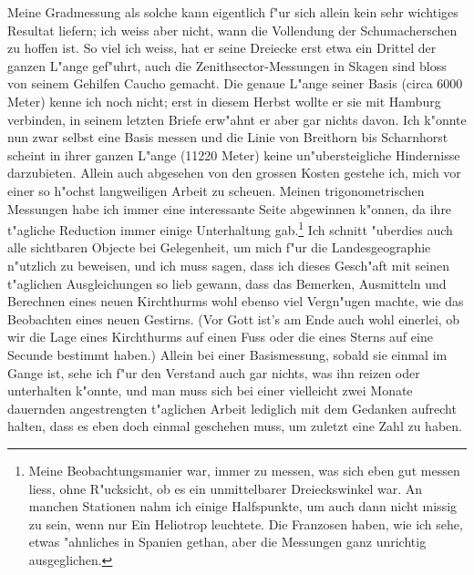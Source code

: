 \documentclass[12pt,a4paper]{article}
\theoremstyle{plain}
\theoremstyle{definition}
\theoremstyle{remark}
\begin{document}
\newpage
\noindent Meine Gradmessung als solche kann eigentlich f"ur sich allein kein sehr wichtiges Resultat liefern; ich weiss aber nicht, wann die Vollendung der Schumacherschen zu hoffen ist. So viel ich weiss, hat er seine Dreiecke erst etwa ein Drittel der ganzen L"ange gef"uhrt, auch die Zenithsector-Messungen in Skagen sind bloss von seinem Gehilfen Caucho gemacht. Die genaue L"ange seiner Basis (circa 6000 Meter) kenne ich noch nicht; erst in diesem Herbst wollte er sie mit Hamburg verbinden, in seinem letzten Briefe erw"ahnt er aber gar nichts davon. Ich k"onnte nun zwar selbst eine Basis messen und die Linie von Breithorn bis Scharnhorst scheint in ihrer ganzen L"ange (11220 Meter) keine un"ubersteigliche Hindernisse darzubieten. Allein auch abgesehen von den grossen Kosten gestehe ich, mich vor einer so h"ochst langweiligen Arbeit zu scheuen. Meinen trigonometrischen Messungen habe ich immer eine interessante Seite abgewinnen k"onnen, da ihre t"agliche Reduction immer einige Unterhaltung gab.\footnote{Meine Beobachtungsmanier war, immer zu messen, was sich eben gut messen liess, ohne R"ucksicht, ob es ein unmittelbarer Dreieckswinkel war. An manchen Stationen nahm ich einige Halfspunkte, um auch dann nicht missig zu sein, wenn nur Ein Heliotrop leuchtete. Die Franzosen haben, wie ich sehe, etwas "ahnliches in Spanien gethan, aber die Messungen ganz unrichtig ausgeglichen.} Ich schnitt "uberdies auch alle sichtbaren Objecte bei Gelegenheit, um mich f"ur die Landesgeographie n"utzlich zu beweisen, und ich muss sagen, dass ich dieses Gesch"aft mit seinen t"aglichen Ausgleichungen so lieb gewann, dass das Bemerken, Ausmitteln und Berechnen eines neuen Kirchthurms wohl ebenso viel Vergn"ugen machte, wie das Beobachten eines neuen Gestirns. (Vor Gott ist's am Ende auch wohl einerlei, ob wir die Lage eines Kirchthurms auf einen Fuss oder die eines Sterns auf eine Secunde bestimmt haben.) Allein bei einer Basismessung, sobald sie einmal im Gange ist, sehe ich f"ur den Verstand auch gar nichts, was ihn reizen oder unterhalten k"onnte, und man muss sich bei einer vielleicht zwei Monate dauernden angestrengten t"aglichen Arbeit lediglich mit dem Gedanken aufrecht halten, dass es eben doch einmal geschehen muss, um zuletzt eine Zahl zu haben.
\end{document}

